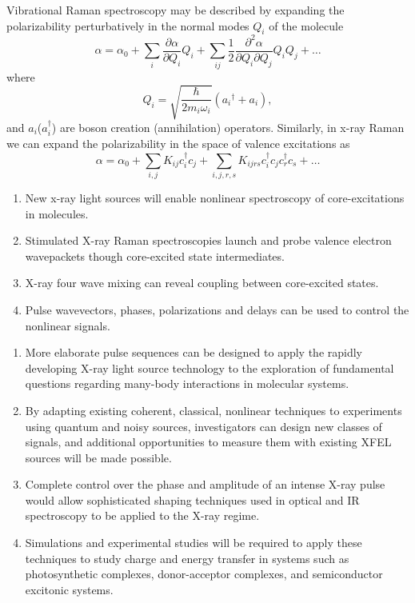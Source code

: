 \documentclass{ar-1col}
\begin{document}
Vibrational Raman spectroscopy may be described by expanding the polarizability
perturbatively in the normal modes $Q_i$ of the molecule
\begin{equation}\label{eq:polexpansion}
\alpha = \alpha_0+ \sum_i\frac{\partial \alpha}{\partial Q_i} Q_i+ \sum_{i j}\frac{1}{2}\frac{\partial^2 \alpha}{\partial Q_i \partial Q_j} Q_i Q_j + \dots
\end{equation}
where
\begin{equation}\label{eq:modedef}
Q_i=  \sqrt{\frac{\hbar}{2 m_i \omega_i}} (a_i{}^{\dagger }+a_i),
\end{equation}
and $a_i$($a_i^{\dagger}$) are
boson creation (annihilation) operators.  Similarly, in x-ray Raman we
can expand the polarizability in the space of valence excitations as
\begin{equation}
\alpha = \alpha_0+ \sum_{i,j}K_{ij} c_i^\dagger c_j + \sum_{i,j,r,s}K_{ijrs} c_i^\dagger c_j c_r^\dagger c_s + \dots
\end{equation}


\begin{summary}
\begin{enumerate}
\item New x-ray light sources will enable nonlinear spectroscopy of
  core-excitations in molecules.
\item Stimulated X-ray Raman spectroscopies launch and probe valence
  electron wavepackets though core-excited state intermediates.
\item X-ray four wave mixing can reveal coupling between
  core-excited states.
\item Pulse wavevectors, phases, polarizations and  delays can be used
to control the  nonlinear signals.
\end{enumerate}
\end{summary}

\begin{issues}
\begin{enumerate}
\item More elaborate pulse sequences can be designed to apply the rapidly developing X-ray light source technology to the exploration of fundamental questions regarding many-body interactions in molecular systems.
\item By adapting existing coherent, classical, nonlinear techniques to experiments using quantum and noisy sources, investigators can design new classes of signals, and additional opportunities to measure them with existing XFEL sources will be made possible.
\item Complete control over the phase and amplitude of an intense X-ray pulse would allow sophisticated shaping techniques used in optical and IR spectroscopy to be applied to the X-ray regime.
\item Simulations and experimental studies will be required to apply these techniques to study charge and energy transfer in systems such as photosynthetic complexes, donor-acceptor complexes, and semiconductor excitonic systems.
\end{enumerate}
\end{issues}
\end{document}
